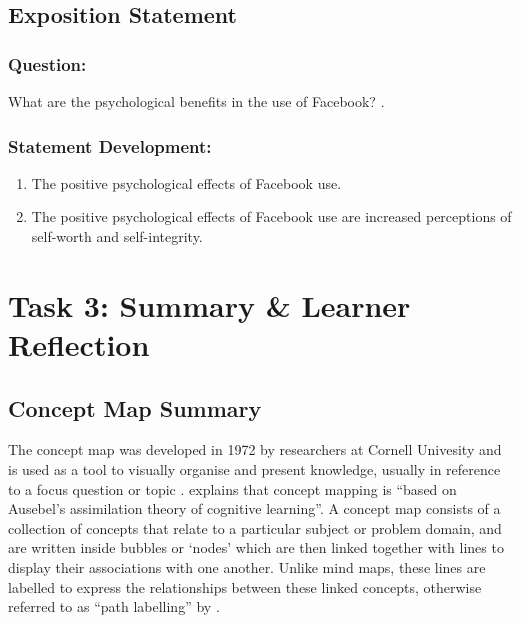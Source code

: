 \documentclass[12pt,a4paper]{report}
\begin{document}
\subsection*{\textsf{Exposition Statement}}

\subsubsection*{\textsf{Question:}}
What are the psychological benefits in the use of Facebook? \citep{Toma2013}.

\subsubsection*{\textsf{Statement Development:}}
\begin{enumerate}
\item The positive psychological effects of Facebook use.
\item The positive psychological effects of Facebook use are increased perceptions of self-worth and self-integrity.
\end{enumerate}

\newpage
\section*{\textsf{Task 3: Summary \& Learner Reflection}}

\subsection*{\textsf{Concept Map Summary}}
The concept map was developed in 1972 by researchers at Cornell Univesity and is used as a tool to visually organise and present knowledge, usually in reference to a focus question or topic \citep{Novak2006, Hilbert2009}. \citet[pp. 267]{Hilbert2009} explains that concept mapping is ``based on Ausebel's assimilation theory of cognitive learning''. A concept map consists of a collection of concepts that relate to a particular subject or problem domain, and are written inside bubbles or `nodes' which are then linked together with lines to display their associations with one another. Unlike mind maps, these lines are labelled to express the relationships between these linked concepts, otherwise referred to as ``path labelling'' by \citet[pp. 790]{Rodriguez-Priego2013}.\\
\end{document}
